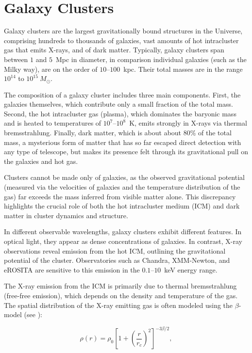 \section{Galaxy Clusters}

Galaxy clusters are the largest gravitationally bound structures in the Universe, 
comprising hundreds to thousands of galaxies, 
vast amounts of hot intracluster gas that emits X-rays, and of dark matter.
Typically, galaxy clusters span between $1$ and $5$~Mpc in diameter, 
in comparison individual galaxies (such as the Milky way), are on the order of $10$--$100$~kpc. Their total 
masses are in the range $10^{14}$ to $10^{15}~M_\odot$. 

The composition of a galaxy cluster includes three main components. First, the 
galaxies themselves, which contribute only a small fraction of the total mass. 
Second, the hot intracluster gas (plasma), which dominates the baryonic mass and is heated to temperatures 
of $10^7$--$10^8$~K, emits strongly in X-rays via thermal bremsstrahlung. Finally, dark matter, 
which is about about 80\% of the total mass, a mysterious form of matter that has so far escaped direct detection with any type of 
telescope, but makes its presence felt through its gravitational pull on the galaxies and hot gas.

Clusters cannot be made only of galaxies, as the observed gravitational potential 
(measured via the velocities of galaxies and the temperature distribution of the gas) 
far exceeds the mass inferred from visible matter alone. This discrepancy highlights the 
crucial role of both the hot intracluster medium (ICM) and dark matter in cluster dynamics 
and structure.

In different observable wavelengths, galaxy clusters exhibit different features.
In optical light, they appear as dense concentrations of galaxies. In contrast, X-ray observations 
reveal emission from the hot ICM, outlining the gravitational potential of the cluster. 
Observatories such as Chandra, XMM-Newton, and eROSITA are sensitive to this emission in the $0.1$--$10$~keV energy range.

The X-ray emission from the ICM is primarily due to thermal bremsstrahlung (free-free emission), which depends on the density and temperature of the gas. The spatial distribution of the X-ray emitting gas is often modeled using the $\beta$-model (see \cite{Sarazin2002_NED}):

\[
\rho(r) = \rho_0 \left[ 1 + \left( \frac{r}{r_c} \right)^2 \right]^{-3\beta/2},
\]

